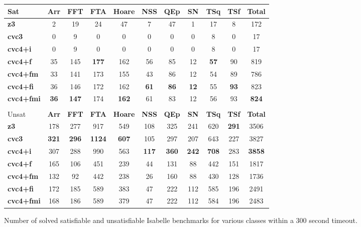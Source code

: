 \documentclass{svjour3}                     %
\begin{document}
\begin{figure}[t]
\centering
{\scriptsize
\begin{tabular}{|l|c|c|c|c|c|c|c|c|c|c|}
\hline
Sat & {\bf Arr} & {\bf FFT} & {\bf FTA} & {\bf Hoare} & {\bf NSS} & {\bf QEp} & {\bf SN} & {\bf TSq} & {\bf TSf} & {\bf Total}
\\
\hline
{\bf z3 } & 2 & 19 & 24 & 47 & 7 & 47 & 1 & 17 & 8 & 172 
\\
{\bf cvc3 } & 0 & 9 & 0 & 0 & 0 & 0 & 0 & 8 & 0 & 17 
\\
{\bf cvc4+i } & 0 & 9 & 0 & 0 & 0 & 0 & 0 & 8 & 0 & 17 
\\
{\bf cvc4+f } & 35 & 145 & {\bf 177 } & 162 & 56 & 85 & 12 & {\bf 57 } & 90 & 819 
\\
{\bf cvc4+fm } & 33 & 141 & 173 & 155 & 43 & 86 & 12 & 54 & 89 & 786 
\\
{\bf cvc4+fi } & 36 & 146 & 172 & 162 & {\bf 61 } & {\bf 86 } & {\bf 12 } & 55 & {\bf 93 } & 823 
\\
{\bf cvc4+fmi } & {\bf 36 } & {\bf 147 } & 174 & {\bf 162 } & 61 & 83 & 12 & 56 & 93 & {\bf 824 }
\\
\hline
\multicolumn{10}{c}{}
\\[-1ex]
\hline
Unsat & {\bf Arr} & {\bf FFT} & {\bf FTA} & {\bf Hoare} & {\bf NSS} & {\bf QEp} & {\bf SN} & {\bf TSq} & {\bf TSf} & {\bf Total}
\\
\hline
{\bf z3 } & 178 & 277 & 917 & 549 & 108 & 325 & 241 & 620 & {\bf 291 } & 3506 
\\
{\bf cvc3 } & {\bf 321 } & {\bf 296 } & {\bf 1124 } & {\bf 607 } & 105 & 297 & 207 & 643 & 227 & 3827 
\\
{\bf cvc4+i } & 307 & 288 & 990 & 563 & {\bf 117 } & {\bf 360 } & {\bf 242 } & {\bf 708 } & 283 & {\bf 3858 } 
\\
{\bf cvc4+f } & 165 & 106 & 451 & 239 & 44 & 131 & 88 & 442 & 151 & 1817 
\\
{\bf cvc4+fm } & 132 & 92 & 442 & 238 & 26 & 160 & 88 & 430 & 128 & 1736 
\\
{\bf cvc4+fi } & 172 & 185 & 589 & 383 & 47 & 222 & 112 & 585 & 196 & 2491 
\\
{\bf cvc4+fmi } & 168 & 186 & 589 & 379 & 47 & 222 & 112 & 584 & 196 & 2483 
\\
\hline
\end{tabular}
}
\caption{
Number of solved satisfiable and unsatisfiable Isabelle benchmarks
for various classes within a 300 second timeout.}
\label{fig:isabelle-results}
\end{figure}
\end{document}
